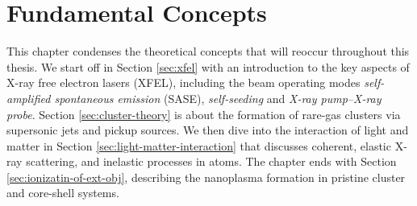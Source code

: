 \chapter{Fundamental Concepts}\label{ch:fundamental_concepts}
This chapter condenses the theoretical concepts that will reoccur throughout this thesis. We start off in Section \ref{sec:xfel} with an introduction to the key aspects of X-ray free electron lasers (XFEL), including the beam operating modes \textit{self-amplified spontaneous emission} (SASE), \textit{self-seeding} and \textit{X-ray pump--X-ray probe}. Section \ref{sec:cluster-theory} is about the formation of rare-gas clusters via supersonic jets and pickup sources. We then dive into the interaction of light and matter in Section \ref{sec:light-matter-interaction} that discusses coherent, elastic X-ray scattering, and inelastic processes in atoms. The chapter ends with Section \ref{sec:ionizatin-of-ext-obj}, describing the nanoplasma formation in pristine cluster and core-shell systems.
%
%
%
